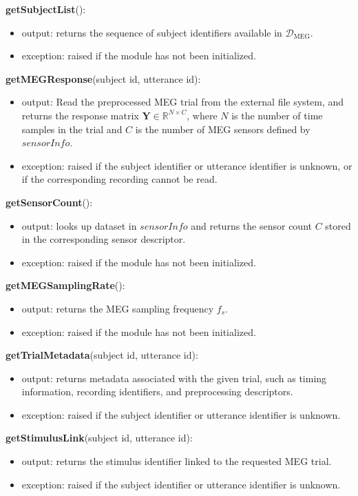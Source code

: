 \documentclass[12pt, titlepage]{article}
\begin{document}
\noindent \textbf{getSubjectList}():
\begin{itemize}
    \item output: returns the sequence of subject identifiers available in $\mathcal{D}_{\mathrm{MEG}}$.
    \item exception: raised if the module has not been initialized.
\end{itemize}

\noindent \textbf{getMEGResponse}(subject id, utterance id):
\begin{itemize}
    \item output: Read the preprocessed MEG trial from the external file system, and returns the response matrix $\mathbf{Y} \in \mathbb{R}^{N \times C}$, where $N$ is the number of time samples in the trial and $C$ is the number of MEG sensors defined by $sensorInfo$.
    \item exception: raised if the subject identifier or utterance identifier is unknown, or if the corresponding recording cannot be read.
\end{itemize}

\noindent \textbf{getSensorCount}():
\begin{itemize}
    \item output: looks up dataset in $sensorInfo$ and returns the sensor count $C$ stored in the corresponding sensor descriptor.
    \item exception: raised if the module has not been initialized.
\end{itemize}

\noindent \textbf{getMEGSamplingRate}():
\begin{itemize}
    \item output: returns the MEG sampling frequency $f_s$.
    \item exception: raised if the module has not been initialized.
\end{itemize}

\noindent \textbf{getTrialMetadata}(subject id, utterance id):
\begin{itemize}
    \item output: returns metadata associated with the given trial, such as timing information, recording identifiers, and preprocessing descriptors.
    \item exception: raised if the subject identifier or utterance identifier is unknown.
\end{itemize}

\noindent \textbf{getStimulusLink}(subject id, utterance id):
\begin{itemize}
    \item output: returns the stimulus identifier linked to the requested MEG trial.
    \item exception: raised if the subject identifier or utterance identifier is unknown.
\end{itemize}
\end{document}
